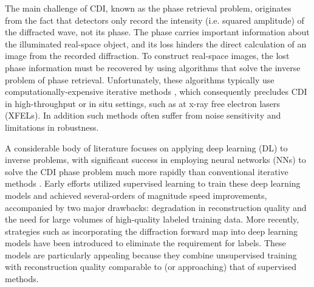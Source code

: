 \documentclass[sn-mathphys]{sn-jnl}%
\theoremstyle{thmstyleone}%
\theoremstyle{thmstyletwo}%
\theoremstyle{thmstylethree}%
\begin{document}
The main challenge of CDI, known as the phase retrieval problem, originates from the fact that detectors only record the intensity (i.e. squared amplitude) of the diffracted wave, not its phase. The phase carries important information about the illuminated real-space object, and its loss hinders the direct calculation of an image from the recorded diffraction. To construct real-space images, the lost phase information must be recovered by using algorithms that solve the inverse problem of phase retrieval. Unfortunately, these algorithms typically use computationally-expensive iterative methods \cite{epie}, which consequently precludes CDI in high-throughput or in situ settings, such as at x-ray free electron lasers (XFELs). In addition such methods often suffer from noise sensitivity and limitations in robustness.


A considerable body of literature focuses on applying deep learning (DL) to inverse problems, with significant success in employing neural networks (NNs) to solve the CDI phase problem much more rapidly than conventional iterative methods \cite{ratner2021recovering,yao2022autophasenn}. Early efforts utilized supervised learning to train these deep learning models and achieved several-orders of magnitude speed improvements, accompanied by two major drawbacks: degradation in reconstruction quality and the need for large volumes of high-quality labeled training data. More recently, strategies such as incorporating the diffraction forward map into deep learning models have been introduced to eliminate the requirement for labels. These models are particularly appealing because they combine unsupervised training with reconstruction quality comparable to (or approaching) that of supervised methods.
\end{document}
